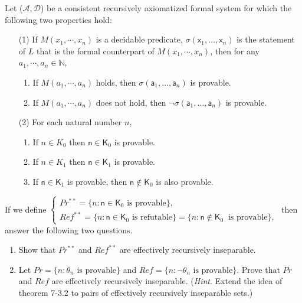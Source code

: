\documentclass[12pt,a4paper]{article}
\theoremstyle{definition}
\numberwithin{equation}{section}
\numberwithin{figure}{section}
\begin{document}
\begin{enumerate}
    Let ($\mathscr{A},\mathscr{D}$) be a consistent recursively axiomatized formal system for which the following two properties hold:
	\begin{enumerate}
	\item[(1)] If $M(x_{1},\cdots,x_{n})$ is a decidable predicate, $\sigma(\textsf{x}_{1},\ldots,\textsf{x}_{n})$ is the statement of $L$ that is the formal counterpart of $M(x_1, \cdots, x_n)$, then for any $a_1, \cdots, a_n \in \mathbb{N}$,
	\begin{enumerate}
	\item If $M(a_{1},\cdots,a_{n})$ holds, then $\sigma(\textsf{a}_{1},\ldots,\textsf{a}_{n})$ is provable.
	\item If $M(a_{1},\cdots,a_{n})$ does not hold, then $\neg\sigma(\textsf{a}_{1},\ldots,\textsf{a}_{n})$ is provable.
	\end{enumerate}
	\item[(2)]  For each natural number $n$,
	\begin{enumerate}
	\item If $n\in K_{0}$ then $\textsf{n}\in \textsf{K}_{0}$ is provable.
	\item If $n\in K_{1}$ then $\textsf{n}\in \textsf{K}_{1}$ is provable.
	\item If $\textsf{n}\in \textsf{K}_{1}$ is provable, then $\textsf{n}\notin \textsf{K}_{0}$ is also provable.
	\end{enumerate}
	\end{enumerate}
	If we define $\left\{
	\begin{array}{l}
	Pr^{**} = \{n:\textsf{n}\in \textsf{K}_{0} \mbox{ is provable}\}, \\
	Ref^{**}=\{n: \textsf{n}\in \textsf{K}_{0} \mbox{ is refutable}\}=\{n: \textsf{n}\notin \textsf{K}_{0}\ \mbox{ is provable}\},
	\end{array}\right.$ then answer the following two questions.
	\begin{enumerate}
	\item Show that $Pr^{**}$ and $Ref^{**}$ are effectively recursively inseparable.
	\item Let $Pr=\{n:\theta_n \mbox{ is provable}\}$ and $Ref=\{n:\neg \theta_n \mbox{ is provable}\}$. Prove that $Pr$ and $Ref$ are effectively recursively inseparable. (\emph{Hint}. Extend the idea of theorem 7-3.2 to pairs of effectively recursively inseparable sets.)
	\end{enumerate}

\end{enumerate}
\end{document}
